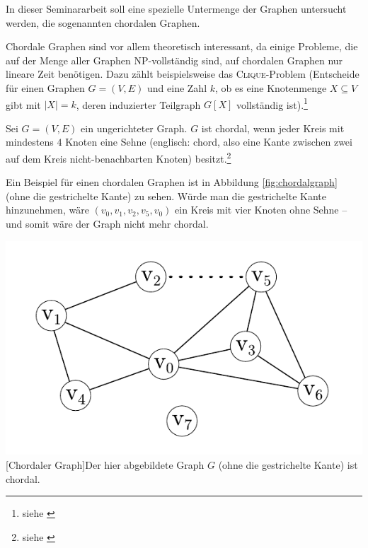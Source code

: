 In dieser Seminararbeit soll eine spezielle Untermenge der Graphen un\-ter\-sucht werden, die sogenannten chordalen Graphen.

Chordale Graphen sind vor allem theoretisch interessant, da einige Probleme, die auf der Menge aller Graphen NP-vollständig sind, auf chordalen Graphen nur lineare Zeit benötigen. Dazu zählt beispielsweise das \textsc{Clique}-Problem (Entscheide für einen Graphen \( G = \left( V, E \right) \) und eine Zahl \( k \), ob es eine Knotenmenge \( X \subseteq V \) gibt mit \( \left| X \right| = k \), deren induzierter Teilgraph \( G \left[ X \right] \) vollständig ist).\footnote{siehe \cite[Satz 4.17]{golumbic}}%

\begin{definition}
	Sei \( G = \left( V, E \right)\) ein ungerichteter Graph.\linebreak{}
	\( G \) ist chordal, wenn jeder Kreis mit mindestens \( 4 \) Knoten eine Sehne (englisch: chord, also eine Kante zwischen zwei auf dem Kreis nicht-benachbarten Knoten) besitzt.\footnote{siehe \cite[Kapitel 4.1]{golumbic}}
\end{definition}

Ein Beispiel für einen chordalen Graphen ist in Abbildung \ref{fig:chordalgraph} (ohne die gestrichelte Kante) zu sehen. Würde man die gestrichelte Kante hinzunehmen, wäre \( \left( v_0, v_1, v_2, v_5, v_0 \right) \) ein Kreis mit vier Knoten ohne Sehne -- und somit wäre der Graph nicht mehr chordal.

\vspace{1em}
\begin{minipage}{\linewidth}
	\centering
	\includegraphics[scale=0.9]{img/graph/chordal.pdf}
	[Chordaler Graph]{Der hier abgebildete Graph \( G \) (ohne die gestrichelte Kante) ist chordal.}
	\label{fig:chordalgraph}
\end{minipage}

